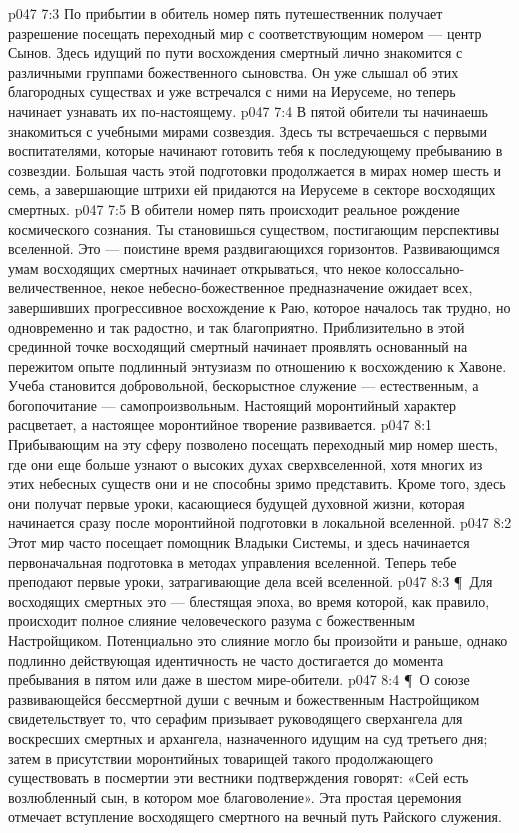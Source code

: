 \vs p047 7:3 По прибытии в обитель номер пять путешественник получает разрешение посещать переходный мир с соответствующим номером --- центр Сынов. Здесь идущий по пути восхождения смертный лично знакомится с различными группами божественного сыновства. Он уже слышал об этих благородных существах и уже встречался с ними на Иерусеме, но теперь начинает узнавать их по\hyp{}настоящему.
\vs p047 7:4 В пятой обители ты начинаешь знакомиться с учебными мирами созвездия. Здесь ты встречаешься с первыми воспитателями, которые начинают готовить тебя к последующему пребыванию в созвездии. Большая часть этой подготовки продолжается в мирах номер шесть и семь, а завершающие штрихи ей придаются на Иерусеме в секторе восходящих смертных.
\vs p047 7:5 В обители номер пять происходит реальное рождение космического сознания. Ты становишься существом, постигающим перспективы вселенной. Это --- поистине время раздвигающихся горизонтов. Развивающимся умам восходящих смертных начинает открываться, что некое колоссально\hyp{}величественное, некое небесно\hyp{}божественное предназначение ожидает всех, завершивших прогрессивное восхождение к Раю, которое началось так трудно, но одновременно и так радостно, и так благоприятно. Приблизительно в этой срединной точке восходящий смертный начинает проявлять основанный на пережитом опыте подлинный энтузиазм по отношению к восхождению к Хавоне. Учеба становится добровольной, бескорыстное служение --- естественным, а богопочитание --- самопроизвольным. Настоящий моронтийный характер расцветает, а настоящее моронтийное творение развивается.
\vs p047 8:1 Прибывающим на эту сферу позволено посещать переходный мир номер шесть, где они еще больше узнают о высоких духах сверхвселенной, хотя многих из этих небесных существ они и не способны зримо представить. Кроме того, здесь они получат первые уроки, касающиеся будущей духовной жизни, которая начинается сразу после моронтийной подготовки в локальной вселенной.
\vs p047 8:2 Этот мир часто посещает помощник Владыки Системы, и здесь начинается первоначальная подготовка в методах управления вселенной. Теперь тебе преподают первые уроки, затрагивающие дела всей вселенной.
\vs p047 8:3 \P\ Для восходящих смертных это --- блестящая эпоха, во время которой, как правило, происходит полное слияние человеческого разума с божественным Настройщиком. Потенциально это слияние могло бы произойти и раньше, однако подлинно действующая идентичность не часто достигается до момента пребывания в пятом или даже в шестом мире\hyp{}обители.
\vs p047 8:4 \P\ О союзе развивающейся бессмертной души с вечным и божественным Настройщиком свидетельствует то, что серафим призывает руководящего сверхангела для воскресших смертных и архангела, назначенного идущим на суд третьего дня; затем в присутствии моронтийных товарищей такого продолжающего существовать в посмертии эти вестники подтверждения говорят: «Сей есть возлюбленный сын, в котором мое благоволение». Эта простая церемония отмечает вступление восходящего смертного на вечный путь Райского служения.

